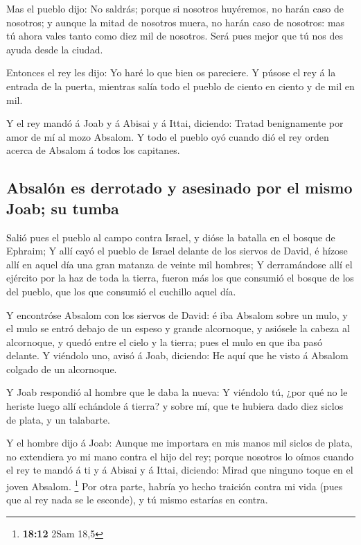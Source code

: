  Mas el pueblo dijo: No saldrás; porque si nosotros
huyéremos, no harán caso de nosotros; y aunque la mitad de nosotros
muera, no harán caso de nosotros: mas tú ahora vales tanto como diez mil
de nosotros. Será pues mejor que tú nos des ayuda desde la ciudad.

 Entonces el rey les dijo: Yo haré lo que bien os
pareciere. Y púsose el rey á la entrada de la puerta, mientras salía
todo el pueblo de ciento en ciento y de mil en mil.

 Y el rey mandó á Joab y á Abisai y á Ittai, diciendo:
Tratad benignamente por amor de mí al mozo Absalom. Y todo el pueblo oyó
cuando dió el rey orden acerca de Absalom á todos los capitanes.

\hypertarget{absaluxf3n-es-derrotado-y-asesinado-por-el-mismo-joab-su-tumba}{%
\subsection{Absalón es derrotado y asesinado por el mismo Joab; su
tumba}\label{absaluxf3n-es-derrotado-y-asesinado-por-el-mismo-joab-su-tumba}}

 Salió pues el pueblo al campo contra Israel, y dióse la
batalla en el bosque de Ephraim;  Y allí cayó el pueblo de
Israel delante de los siervos de David, é hízose allí en aquel día una
gran matanza de veinte mil hombres;  Y derramándose allí
el ejército por la haz de toda la tierra, fueron más los que consumió el
bosque de los del pueblo, que los que consumió el cuchillo aquel día.

 Y encontróse Absalom con los siervos de David: é iba
Absalom sobre un mulo, y el mulo se entró debajo de un espeso y grande
alcornoque, y asiósele la cabeza al alcornoque, y quedó entre el cielo y
la tierra; pues el mulo en que iba pasó delante.  Y
viéndolo uno, avisó á Joab, diciendo: He aquí que he visto á Absalom
colgado de un alcornoque.

 Y Joab respondió al hombre que le daba la nueva: Y
viéndolo tú, ¿por qué no le heriste luego allí echándole á tierra? y
sobre mí, que te hubiera dado diez siclos de plata, y un talabarte.

 Y el hombre dijo á Joab: Aunque me importara en mis
manos mil siclos de plata, no extendiera yo mi mano contra el hijo del
rey; porque nosotros lo oímos cuando el rey te mandó á ti y á Abisai y á
Ittai, diciendo: Mirad que ninguno toque en el joven Absalom.
\footnote{\textbf{18:12} 2Sam 18,5}  Por otra parte,
habría yo hecho traición contra mi vida (pues que al rey nada se le
esconde), y tú mismo estarías en contra.

